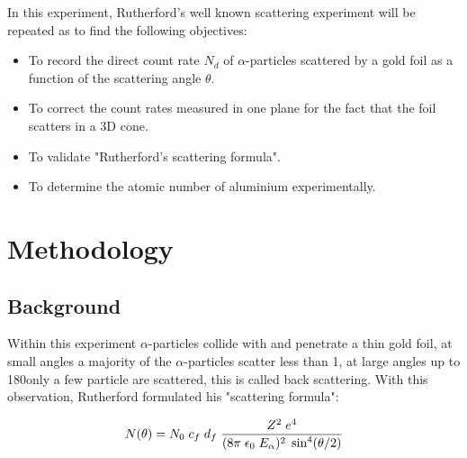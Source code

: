 \documentclass[12pt]{article}
\begin{document}
In this experiment, Rutherford's well known scattering experiment will be repeated as to find the following objectives: \cite{Exp.6-2019}
\begin{itemize}
    \item To record the direct count rate $N_d$ of $\alpha$-particles scattered by a gold foil as a function of the scattering angle $\theta$.
    \item To correct the count rates measured in one plane for the fact that the foil scatters in a 3D cone.
    \item To validate "Rutherford's scattering formula". 
    \item To determine the atomic number of aluminium experimentally. 
\end{itemize}

\section{Methodology}
\label{Methodology Section}
\subsection{Background}
\label{Background Subsection}

Within this experiment $\alpha$-particles collide with and penetrate a thin gold foil, at small angles a majority of the $\alpha$-particles scatter less than 1\textdegree, at large angles up to 180\textdegree only a few particle are scattered, this is called back scattering. With this observation, Rutherford formulated his "scattering formula":

\begin{equation}
N(\theta) = N_0 \hspace{0.1cm} c_f \hspace{0.1cm} d_f \hspace{0.1cm} \dfrac{Z^2 \hspace{0.1cm} e^4}{(8 \pi \hspace{0.1cm} \epsilon_0 \hspace{0.1cm} E_{\alpha})^2 \hspace{0.1cm} \sin^4(\theta / 2) }
\label{Ruthe scat form}
\end{equation} 
\end{document}
